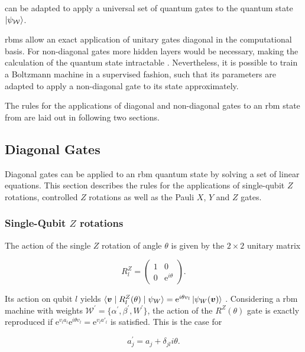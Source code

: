 can be adapted to apply a universal set of quantum gates to the quantum state $\Ket{\psi_{\mathcal{W}}}$.

\gls{rbm}s allow an exact application of unitary gates diagonal in the computational basis. For non-diagonal 
gates more hidden layers would be necessary, making the calculation of the quantum state intractable \cite{carleo2018constructing}. Nevertheless, it is possible to train a Boltzmann machine in a supervised fashion, such that its parameters are adapted to apply a non-diagonal gate to its state approximately.

The rules for the applications of diagonal and non-diagonal gates to an \gls{rbm} state from 
\cite{jnsson2018neuralnetwork} are laid out in following two sections.

\subsection{Diagonal Gates}

Diagonal gates can be applied to an \gls{rbm} quantum state by solving a set of linear equations. 
This section describes the rules for the applications of single-qubit $Z$ rotations, controlled $Z$ rotations 
as well as the Pauli $X$, $Y$ and $Z$ gates.

\subsubsection{Single-Qubit $Z$ rotations}
The action of the single $Z$ rotation of angle $\theta$ is given by the $2\times2$ unitary matrix

\begin{equation}
    R_l^Z=
    \begin{pmatrix}
        1 & 0 \\
        0 & \mathrm{e}^{i\theta}
    \end{pmatrix} .
\end{equation}

Its action on qubit $l$ yields 
$\langle \bm{v} \mid R_{l}^{Z}(\theta) \mid \psi_{W}  \rangle = 
\mathrm{e}^{i\theta v_{l}} \Ket{\psi_{W}(\bm{v})}
$
. Considering a \gls{rbm} machine with weights $\mathcal{W}^{\prime} = \{\alpha^{\prime},\beta^{\prime},W^{\prime}\}$, the action of the $R^{Z}(\theta)$
gate is exactly reproduced if $\mathrm{e}^{v_{l}a_{l}}\mathrm{e}^{i\theta v_{l}} = \mathrm{e}^{v_{l}a\prime_{l}}$
is satisfied. This is the case for

\begin{equation}
    a^{\prime}_{j} = a_{j} + \delta_{jl}i\theta.
\end{equation}

